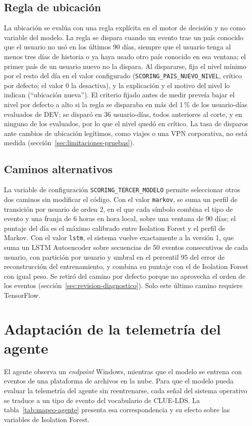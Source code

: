 \subsection{Regla de ubicación}
\label{sec:regla-ubicacion}
La ubicación se evalúa con una regla explícita en el motor de decisión y no como variable del modelo. La regla se dispara cuando un evento trae un país conocido que el usuario no usó en los últimos 90 días, siempre que el usuario tenga al menos tres días de historia o ya haya usado otro país conocido en esa ventana; el primer país de un usuario nuevo no la dispara. Al dispararse, fija el nivel mínimo por el resto del día en el valor configurado (\texttt{SCORING\_\allowbreak{}PAIS\_\allowbreak{}NUEVO\_\allowbreak{}NIVEL}, crítico por defecto; el valor 0 la desactiva), y la explicación y el motivo del nivel lo indican (``ubicación nueva''). El criterio fijado antes de medir preveía bajar el nivel por defecto a alto si la regla se disparaba en más del 1\,\% de los usuario-días evaluados de DEV; se disparó en 36 usuario-días, todos anteriores al corte, y en ninguno de los evaluados, por lo que el nivel quedó en crítico. La tasa de disparos ante cambios de ubicación legítimos, como viajes o una VPN corporativa, no está medida (sección~\ref{sec:limitaciones-pruebas}).

\subsection{Caminos alternativos}
\label{sec:caminos-alternativos}
La variable de configuración \texttt{SCORING\_\allowbreak{}TERCER\_\allowbreak{}MODELO} permite seleccionar otros dos caminos sin modificar el código. Con el valor \texttt{markov}, se suma un perfil de transición por usuario de orden 2, en el que cada símbolo combina el tipo de evento y una franja de 6 horas en hora local, sobre una ventana de 90 días; el puntaje del día es el máximo calibrado entre Isolation Forest y el perfil de Markov. Con el valor \texttt{lstm}, el sistema vuelve exactamente a la versión 1, que suma un LSTM Autoencoder sobre secuencias de 50 eventos consecutivos de cada usuario, con partición por usuario y umbral en el percentil 95 del error de reconstrucción del entrenamiento, y combina su puntaje con el de Isolation Forest con igual peso. Se retiró del camino por defecto porque no aprovecha el orden de los eventos (sección~\ref{sec:revision-diagnostico}). Solo este último camino requiere TensorFlow.


\section{Adaptación de la telemetría del agente}
\label{sec:mapeo-agente}
El agente observa un \emph{endpoint} Windows, mientras que el modelo se entrena con eventos de una plataforma de archivos en la nube. Para que el modelo pueda evaluar la telemetría del agente sin reentrenarse, cada señal del sistema operativo se traduce a un tipo de evento del vocabulario de CLUE-LDS. La tabla~\ref{tab:mapeo-agente} presenta esa correspondencia y su efecto sobre las variables de Isolation Forest.

